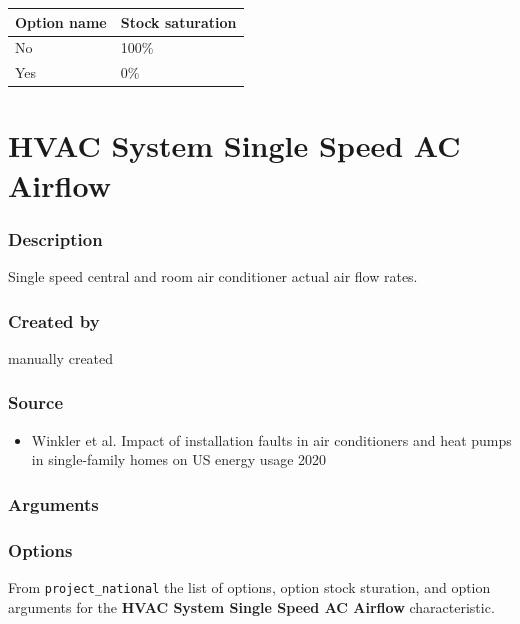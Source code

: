 \begin{longtable}[]{@{}ll@{}}
\toprule\noalign{}
Option name & Stock saturation \\
\midrule\noalign{}
\endhead
\bottomrule\noalign{}
\endlastfoot
No & 100\% \\
Yes & 0\% \\
\end{longtable}

\section{HVAC System Single Speed AC
Airflow}\label{hvac_system_single_speed_ac_airflow}

\subsubsection{Description}\label{description-81}

Single speed central and room air conditioner actual air flow rates.

\subsubsection{Created by}\label{created-by-81}

manually created

\subsubsection{Source}\label{source-80}

\begin{itemize}
 
\item
  Winkler et al. \textquotesingle Impact of installation faults in air
  conditioners and heat pumps in single-family homes on US energy
  usage\textquotesingle{} 2020
\end{itemize}

\subsubsection{Arguments}\label{arguments-50}



\subsubsection{Options}\label{options-81}

From \texttt{project\_national} the list of options, option stock
sturation, and option arguments for the \textbf{HVAC System Single Speed
AC Airflow} characteristic.



